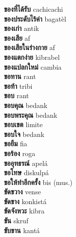 \textbf{ ของที่ได้รับ  } cachicachi \\
\textbf{ ของประดับไร้ค่า  } bagatèl \\
\textbf{ ของเก่า  } antik \\
\textbf{ ของเสีย  } af \\
\textbf{ ของเสียในร่างกาย  } af \\
\textbf{ ของแตกง่าย  } kibrabel \\
\textbf{ ของแปลกใหม่  } cambia \\
\textbf{ ขอทาน  } rant \\
\textbf{ ขอท้า  } tribi \\
\textbf{ ขอบ  } rant \\
\textbf{ ขอบคุณ  } bedank \\
\textbf{ ขอบพระคุณ  } bedank \\
\textbf{ ขอบเขต  } limite \\
\textbf{ ขอบใจ  } bedank \\
\textbf{ ขอยืม  } fia \\
\textbf{ ขอร้อง  } roga \\
\textbf{ ขออุทธรณ์  } apelá \\
\textbf{ ขอโทษ  } diskulpá \\
\textbf{ ขอให้ทำอีกครั้ง  } bis (mus.) \\
\textbf{ ขัดขวาง  } vense \\
\textbf{ ขัดขาง  } konkistá \\
\textbf{ ขัดจังหวะ  } kibra \\
\textbf{ ขัน  } skruf \\
\textbf{ ขับขาน  } kantá \\
